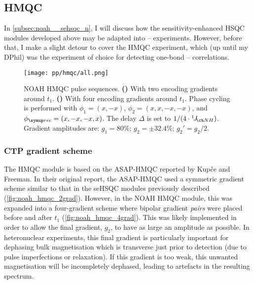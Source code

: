 \subsection{\texorpdfstring{\nitrogen{}}{15N} HMQC}
\label{subsec:noah__hmqc}

In \cref{subsec:noah__sehsqc_n}, I will discuss how the sensitivity-enhanced HSQC modules developed above may be adapted into \proton{}--\nitrogen{} experiments.
However, before that, I make a slight detour to cover the \nitrogen{} HMQC experiment, which (up until my DPhil) was the experiment of choice for detecting one-bond \proton{}--\nitrogen{} correlations.

\begin{figure}[htb]
    \centering
    \texttt{[image: pp/hmqc/all.png]}%
    {\label{fig:noah_hmqc_2grad}}%
    {\label{fig:noah_hmqc_4grad}}%
    \caption[NOAH HMQC pulse sequences]{
        NOAH HMQC pulse sequences.
        \textbf{()} With two encoding gradients around $t_1$.
        \textbf{()} With four encoding gradients around $t_1$.
        Phase cycling is performed with $\phi_1 = (x, -x)$, $\phi_2 = (x, x, -x, -x)$, and $\phirec = (x, -x, -x, x)$.
        The delay $\Delta$ is set to $1 / (4 \cdot \oneJ{NH})$.
        Gradient amplitudes are: $g_1 = 80\%$; $g_2 = \pm 32.4\%$; $g_2' = g_2/2$.
    }
    \label{fig:noah_hmqc}
\end{figure}


\subsubsection{CTP gradient scheme}

The HMQC module is based on the ASAP-HMQC reported by Kup{\v{c}}e and Freeman.\autocite{Kupce2007MRC}
In their original report, the ASAP-HMQC used a symmetric gradient scheme similar to that in the seHSQC modules previously described (\cref{fig:noah_hmqc_2grad}).
However, in the NOAH HMQC module\autocite{Kupce2017ACIE}, this was expanded into a four-gradient scheme where bipolar gradient \textit{pairs} were placed before and after $t_1$ (\cref{fig:noah_hmqc_4grad}).
This was likely implemented in order to allow the final gradient, $g_2$, to have as large an amplitude as possible.
In heteronuclear experiments, this final gradient is particularly important for dephasing bulk magnetisation which is transverse just prior to detection (due to pulse imperfections or relaxation).
If this gradient is too weak, this unwanted magnetisation will be incompletely dephased, leading to artefacts in the resulting spectrum.


